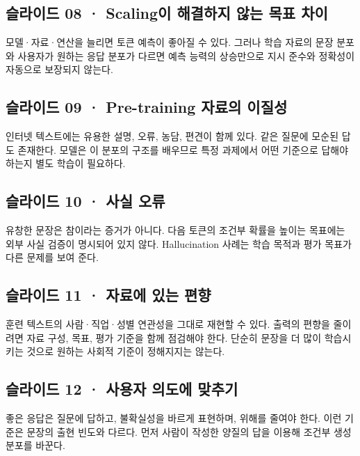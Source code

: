 \documentclass[11pt,a4paper]{article}
\begin{document}
\subsection{슬라이드 08 · Scaling이 해결하지 않는 목표 차이}

모델·자료·연산을 늘리면 토큰 예측이 좋아질 수 있다. 그러나 학습 자료의 문장 분포와 사용자가 원하는 응답 분포가 다르면 예측 능력의 상승만으로 지시 준수와 정확성이 자동으로 보장되지 않는다.\par

\subsection{슬라이드 09 · Pre-training 자료의 이질성}

인터넷 텍스트에는 유용한 설명, 오류, 농담, 편견이 함께 있다. 같은 질문에 모순된 답도 존재한다. 모델은 이 분포의 구조를 배우므로 특정 과제에서 어떤 기준으로 답해야 하는지 별도 학습이 필요하다.\par

\subsection{슬라이드 10 · 사실 오류}

유창한 문장은 참이라는 증거가 아니다. 다음 토큰의 조건부 확률을 높이는 목표에는 외부 사실 검증이 명시되어 있지 않다. Hallucination 사례는 학습 목적과 평가 목표가 다른 문제를 보여 준다.\par

\subsection{슬라이드 11 · 자료에 있는 편향}

훈련 텍스트의 사람·직업·성별 연관성을 그대로 재현할 수 있다. 출력의 편향을 줄이려면 자료 구성, 목표, 평가 기준을 함께 점검해야 한다. 단순히 문장을 더 많이 학습시키는 것으로 원하는 사회적 기준이 정해지지는 않는다.\par

\subsection{슬라이드 12 · 사용자 의도에 맞추기}

좋은 응답은 질문에 답하고, 불확실성을 바르게 표현하며, 위해를 줄여야 한다. 이런 기준은 문장의 출현 빈도와 다르다. 먼저 사람이 작성한 양질의 답을 이용해 조건부 생성 분포를 바꾼다.\par
\end{document}
